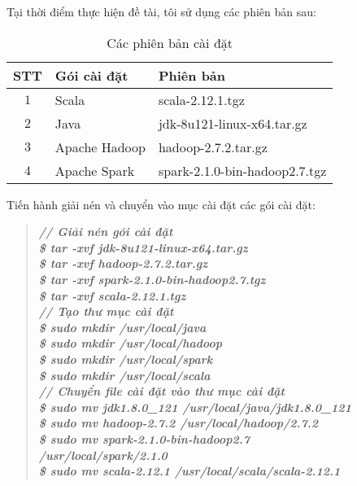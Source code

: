 Tại thời điểm thực hiện đề tài, tôi sử dụng các phiên bản sau:
\begin{table}[H]
	\centering
	\caption{Các phiên bản cài đặt}
	\label{versionlist}
	\begin{tabular}{@{}cll@{}}
		\toprule
		\multicolumn{1}{l}{STT} & Gói cài đặt   & Phiên bản                     \\ \midrule
		$1$                     & Scala         & scala-2.12.1.tgz              \\
		$2$                     & Java          & jdk-8u121-linux-x64.tar.gz    \\
		$3$                     & Apache Hadoop & hadoop-2.7.2.tar.gz           \\
		$4$                     & Apache Spark  & spark-2.1.0-bin-hadoop2.7.tgz \\ \bottomrule
	\end{tabular}
\end{table}

Tiến hành giải nén và chuyển vào mục cài đặt các gói cài đặt:
\begin{quote}
	\textbf{\textit{// Giải nén gói cài đặt \\
	\$ tar -xvf jdk-8u121-linux-x64.tar.gz \\
	\$ tar -xvf hadoop-2.7.2.tar.gz \\
	\$ tar -xvf spark-2.1.0-bin-hadoop2.7.tgz \\
	\$ tar -xvf scala-2.12.1.tgz \\
	// Tạo thư mục cài đặt \\
	\$ sudo mkdir /usr/local/java \\
	\$ sudo mkdir /usr/local/hadoop \\
	\$ sudo mkdir /usr/local/spark \\
	\$ sudo mkdir /usr/local/scala \\
	// Chuyển file cài đặt vào thư mục cài đặt \\
	\$ sudo mv jdk1.8.0\_121 /usr/local/java/jdk1.8.0\_121  \\
	\$ sudo mv hadoop-2.7.2 /usr/local/hadoop/2.7.2 \\
	\$ sudo mv spark-2.1.0-bin-hadoop2.7 \\ /usr/local/spark/2.1.0 \\
	\$ sudo mv scala-2.12.1 /usr/local/scala/scala-2.12.1  \\}}
\end{quote}

